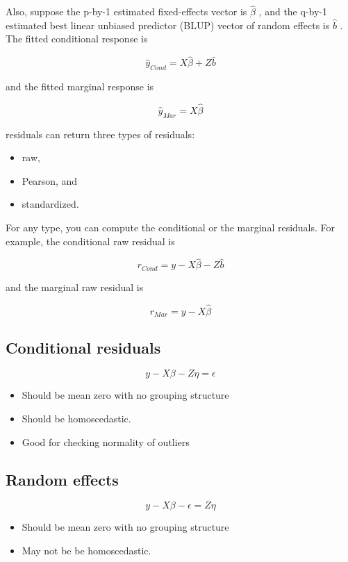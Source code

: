 \documentclass[Main.tex]{subfiles}
\begin{document}
Also, suppose the p-by-1 estimated fixed-effects vector is $\hat{\beta}$ , and the q-by-1 estimated best linear unbiased predictor (BLUP) 
vector of random effects is $\hat{b}$ . The fitted conditional response is

\[ \hat{y}_{Cond} = X \hat{\beta} + Z \hat{b} \]

and the fitted marginal response is


\[ \hat{y}_{Mar} = X \hat{\beta} \]

residuals can return three types of residuals:
\begin{itemize} 
	\item raw, 
	\item Pearson, and 
	\item standardized.\end{itemize} For any type, you can compute the conditional or the marginal residuals. For example, the conditional raw residual is


\[ r_{Cond} = y - X \hat{\beta} - Z \hat{b} \]

and the marginal raw residual is


\[ r_{Mar} = y - X \hat{\beta} \]







\subsection*{Conditional residuals}
\[y - X\beta - Z \eta = \epsilon \]
\begin{itemize}
	\item
	Should be mean zero with no grouping structure
	\item
	Should be homoscedastic.
	\item
	Good for checking normality of outliers
\end{itemize}

\subsection*{Random effects}
\[y - X\beta -\epsilon = Z \eta \]
\begin{itemize}
	\item
	Should be mean zero with no grouping structure
	\item
	May not be be homoscedastic.
\end{itemize}
\end{document}
